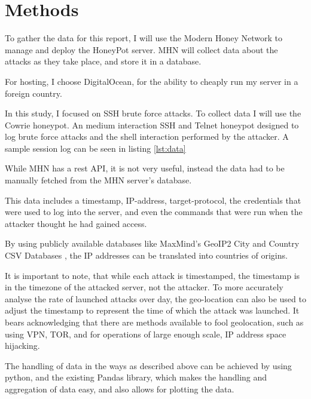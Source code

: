\section{Methods}
  \label{sec:methods}
  

  To gather the data for this report, I will use the Modern 
  Honey Network  to manage 
  and deploy the HoneyPot server. MHN will collect data about
  the attacks as they take place, and store it in a database.


  For hosting, I choose DigitalOcean, for the ability to
  cheaply run my server in a foreign country.
  

  
  
  In this study, I focused on SSH brute force attacks.
  To collect data I will use the Cowrie\cite{Cowrie}
  honeypot. An medium interaction SSH and Telnet honeypot
  designed to log brute force attacks and the shell 
  interaction performed by the attacker. A sample session 
  log can be seen in listing \ref{lst:data}

  

  While MHN has a rest API, it is not very useful,
  instead the data had to be manually fetched from
  the MHN server's database.

  This data includes a timestamp, IP-address,
  target-protocol,
  the credentials that were used to log into the 
  server, and even the commands that were run when
  the attacker thought he had gained access.
  
  
  By using publicly available databases like
  MaxMind's GeoIP2 City and Country CSV Databases
  \cite{maxminds}, the IP addresses can be translated
  into countries of origins.
  

  It is important to note, that while each attack is 
  timestamped, the timestamp is in the timezone of the 
  attacked server, not the attacker. To more accurately
  analyse the rate of launched attacks over day, the
  geo-location can also be used to adjust the timestamp
  to represent the time of which the attack was launched.
  It bears acknowledging that there are methods available
  to fool geolocation, such as using VPN, TOR, and for
  operations of large enough scale, IP address space hijacking.
  

  
  The handling of data in the ways as described above
  can be achieved by using python, and the existing Pandas
  \cite{pandas} library, which makes the handling and
  aggregation of data easy, and also allows for plotting
  the data.
  
  